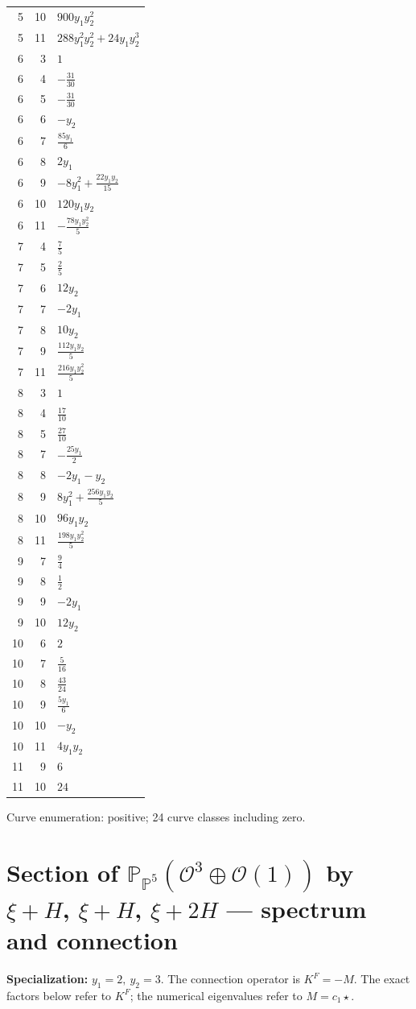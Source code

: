 \documentclass[10pt,a4paper]{article}
\begin{document}
{\begin{longtable}{rrp{125mm}}
5 & 10 & $900 y_{1} y_{2}^{2}$\\
5 & 11 & $288 y_{1}^{2} y_{2}^{2} + 24 y_{1} y_{2}^{3}$\\
6 & 3 & $1$\\
6 & 4 & $- \frac{31}{30}$\\
6 & 5 & $- \frac{31}{30}$\\
6 & 6 & $- y_{2}$\\
6 & 7 & $\frac{85 y_{1}}{6}$\\
6 & 8 & $2 y_{1}$\\
6 & 9 & $- 8 y_{1}^{2} + \frac{22 y_{1} y_{2}}{15}$\\
6 & 10 & $120 y_{1} y_{2}$\\
6 & 11 & $- \frac{78 y_{1} y_{2}^{2}}{5}$\\
7 & 4 & $\frac{7}{5}$\\
7 & 5 & $\frac{2}{5}$\\
7 & 6 & $12 y_{2}$\\
7 & 7 & $- 2 y_{1}$\\
7 & 8 & $10 y_{2}$\\
7 & 9 & $\frac{112 y_{1} y_{2}}{5}$\\
7 & 11 & $\frac{216 y_{1} y_{2}^{2}}{5}$\\
8 & 3 & $1$\\
8 & 4 & $\frac{17}{10}$\\
8 & 5 & $\frac{27}{10}$\\
8 & 7 & $- \frac{25 y_{1}}{2}$\\
8 & 8 & $- 2 y_{1} - y_{2}$\\
8 & 9 & $8 y_{1}^{2} + \frac{256 y_{1} y_{2}}{5}$\\
8 & 10 & $96 y_{1} y_{2}$\\
8 & 11 & $\frac{198 y_{1} y_{2}^{2}}{5}$\\
9 & 7 & $\frac{9}{4}$\\
9 & 8 & $\frac{1}{2}$\\
9 & 9 & $- 2 y_{1}$\\
9 & 10 & $12 y_{2}$\\
10 & 6 & $2$\\
10 & 7 & $\frac{5}{16}$\\
10 & 8 & $\frac{43}{24}$\\
10 & 9 & $\frac{5 y_{1}}{6}$\\
10 & 10 & $- y_{2}$\\
10 & 11 & $4 y_{1} y_{2}$\\
11 & 9 & $6$\\
11 & 10 & $24$\\
\end{longtable}}
Curve enumeration: positive; 24 curve classes including zero.
\clearpage\section*{Section of $\mathbb P_{\mathbb P^{5}}(\mathcal O^{3}\oplus \mathcal O(1))$ by $\xi +H$, $\xi +H$, $\xi +2H$ --- spectrum and connection}
\textbf{Specialization:} $y_1=2,\ y_2=3$. The connection operator is $K^F=-M$. The exact factors below refer to $K^F$; the numerical eigenvalues refer to $M=c_1\star$.
\end{document}
